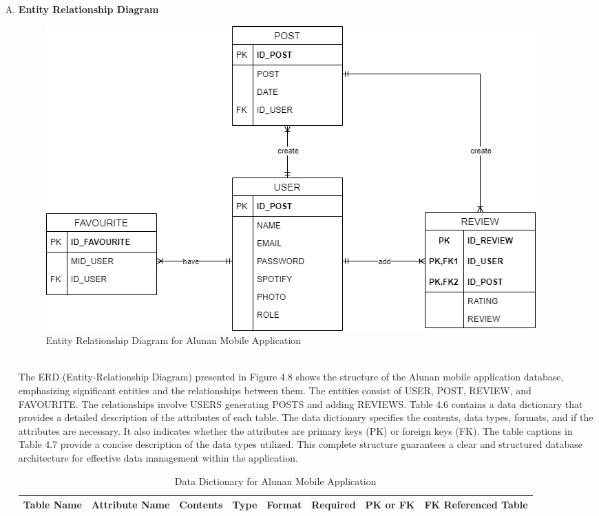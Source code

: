 \begin{enumerate}[A.]
    \item \textbf{Entity Relationship Diagram}
    \begin{figure}[h]
        \centering
        \includegraphics[width=0.9\linewidth]{mainmatter/images/erd.png}
        \caption{Entity Relationship Diagram for Alunan Mobile Application}
        \label{fig:myfig47}
    \end{figure} \\
    The ERD (Entity-Relationship Diagram) presented in Figure 4.8 shows the structure of the Alunan mobile application database, emphasizing significant entities and the relationships between them. The entities consist of USER, POST, REVIEW, and FAVOURITE. The relationships involve USERS generating POSTS and adding REVIEWS. Table 4.6 contains a data dictionary that provides a detailed description of the attributes of each table. The data dictionary specifies the contents, data types, formats, and if the attributes are necessary. It also indicates whether the attributes are primary keys (PK) or foreign keys (FK). The table captions in Table 4.7 provide a concise description of the data types utilized. This complete structure guarantees a clear and structured database architecture for effective data management within the application.
    \pagebreak
    \begin{landscape}
    \begin{longtable}
        {|>{\centering\arraybackslash}m{2.5cm}|>{\centering\arraybackslash}m{3cm}|>{\centering\arraybackslash}m{4cm}|>{\centering\arraybackslash}m{3cm}|>{\centering\arraybackslash}m{2cm}|>{\centering\arraybackslash}m{2cm}|>{\centering\arraybackslash}m{1cm}|>{\centering\arraybackslash}m{3cm}|}
        \caption{Data Dictionary for Alunan Mobile Application} \\
        \hline
        \textbf{Table Name} & \textbf{Attribute Name} & \textbf{Contents} & \textbf{Type} & \textbf{Format} & \textbf{Required} & \textbf{PK or FK} & \textbf{FK Referenced Table} \\ \hline

\end{longtable}
\end{landscape}
\end{enumerate}
